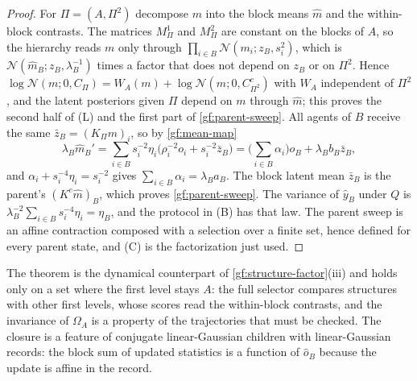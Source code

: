 \begin{proof}
For $\Pi=(A,\Pi^2)$ decompose $m$ into the block means $\hat m$ and the
within-block contrasts. The matrices $M^1_\Pi$ and $M^2_\Pi$ are constant on
the blocks of $A$, so the hierarchy reads $m$ only through
$\prod_{i\in B}\mathcal N(m_i;z_B,s_i^2)$, which is
$\mathcal N(\hat m_B;z_B,\lambda_B^{-1})$ times a factor that does not depend
on $z_B$ or on $\Pi^2$. Hence $\log\mathcal N(m;0,C_\Pi)=W_A(m)+\log\mathcal
N(\hat m;0,C^c_{\Pi^2})$ with $W_A$ independent of $\Pi^2$, and the latent
posteriors given $\Pi$ depend on $m$ through $\hat m$; this proves the second
half of (L) and the first part of \cref{gf:parent-sweep}. All agents of $B$
receive the same $\bar z_B=(K_\Pi m)_i$, so by \cref{gf:mean-map}
\[
 \lambda_B\hat m_B'=\sum_{i\in B}s_i^{-2}\eta_i\big(\rho_i^{-2}o_i
 +s_i^{-2}\bar z_B\big)
 =\Big(\sum_{i\in B}\alpha_i\Big)\hat o_B+\lambda_Bb_B\bar z_B,
\]
and $\alpha_i+s_i^{-4}\eta_i=s_i^{-2}$ gives $\sum_{i\in B}\alpha_i=\lambda_Ba_B$.
The block latent mean $\bar z_B$ is the parent's $(K^c\hat m)_B$, which
proves \cref{gf:parent-sweep}. The variance of $\hat y_B$ under $Q$ is
$\lambda_B^{-2}\sum_{i\in B}s_i^{-4}\eta_i=\eta_B$, and the protocol in (B)
has that law. The parent sweep is an affine contraction composed with a
selection over a finite set, hence defined for every parent state, and (C)
is the factorization just used.
\end{proof}

The theorem is the dynamical counterpart of \cref{gf:structure-factor}(iii)
and holds only on a set where the first level stays $A$: the full selector
compares structures with other first levels, whose scores read the
within-block contrasts, and the invariance of $\Omega_A$ is a property of the
trajectories that must be checked. The closure is a feature of conjugate
linear-Gaussian children with linear-Gaussian records: the block sum of
updated statistics is a function of $\hat o_B$ because the update is affine
in the record.

